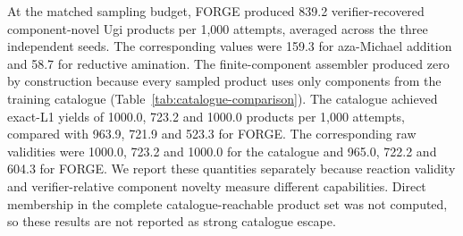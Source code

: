 \documentclass{article}
\theoremstyle{definition}
\newcommand{\ForgeProseCatalogueCatalogueBLExactPerThousand}{723.2}
\newcommand{\ForgeProseCatalogueCatalogueBLValidPerThousand}{723.2}
\newcommand{\ForgeProseCatalogueCatalogueLXExactPerThousand}{1000.0}
\newcommand{\ForgeProseCatalogueCatalogueLXValidPerThousand}{1000.0}
\newcommand{\ForgeProseCatalogueCatalogueUgiExactPerThousand}{1000.0}
\newcommand{\ForgeProseCatalogueCatalogueUgiValidPerThousand}{1000.0}
\newcommand{\ForgeProseCatalogueForgeBLComponentNovelPerThousand}{159.3}
\newcommand{\ForgeProseCatalogueForgeBLExactPerThousand}{721.9}
\newcommand{\ForgeProseCatalogueForgeBLValidPerThousand}{722.2}
\newcommand{\ForgeProseCatalogueForgeLXComponentNovelPerThousand}{58.7}
\newcommand{\ForgeProseCatalogueForgeLXExactPerThousand}{523.3}
\newcommand{\ForgeProseCatalogueForgeLXValidPerThousand}{604.3}
\newcommand{\ForgeProseCatalogueForgeUgiComponentNovelPerThousand}{839.2}
\newcommand{\ForgeProseCatalogueForgeUgiExactPerThousand}{963.9}
\newcommand{\ForgeProseCatalogueForgeUgiValidPerThousand}{965.0}
\begin{document}
At the matched sampling budget, FORGE produced
\ForgeProseCatalogueForgeUgiComponentNovelPerThousand{} verifier-recovered component-novel Ugi
products per 1,000 attempts, averaged across the three independent seeds. The corresponding
values were \ForgeProseCatalogueForgeBLComponentNovelPerThousand{} for aza-Michael addition and
\ForgeProseCatalogueForgeLXComponentNovelPerThousand{} for reductive amination. The finite-component
assembler produced zero by construction because every sampled product uses only components from
the training catalogue (Table~\ref{tab:catalogue-comparison}).
The catalogue achieved exact-L1 yields of
\ForgeProseCatalogueCatalogueUgiExactPerThousand{},
\ForgeProseCatalogueCatalogueBLExactPerThousand{} and
\ForgeProseCatalogueCatalogueLXExactPerThousand{} products per 1,000 attempts, compared with
\ForgeProseCatalogueForgeUgiExactPerThousand{},
\ForgeProseCatalogueForgeBLExactPerThousand{} and
\ForgeProseCatalogueForgeLXExactPerThousand{} for FORGE. The corresponding raw validities were
\ForgeProseCatalogueCatalogueUgiValidPerThousand{},
\ForgeProseCatalogueCatalogueBLValidPerThousand{} and
\ForgeProseCatalogueCatalogueLXValidPerThousand{} for the catalogue and
\ForgeProseCatalogueForgeUgiValidPerThousand{},
\ForgeProseCatalogueForgeBLValidPerThousand{} and
\ForgeProseCatalogueForgeLXValidPerThousand{} for FORGE.
We report these quantities separately because reaction validity and verifier-relative component
novelty measure different capabilities. Direct membership in the complete catalogue-reachable
product set was not computed, so these results are not reported as strong catalogue escape.
\end{document}
